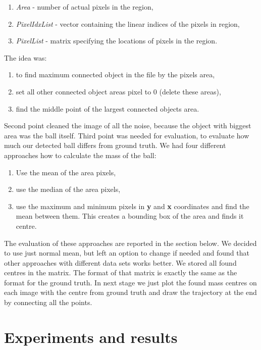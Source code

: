 \documentclass[10pt,a4paper,oneclumn]{article}
\begin{document}
\begin{enumerate}
\item \emph{Area} - number of actual pixels in the region,
\item \emph{PixelIdxList} - vector containing the linear indices of the pixels in region,
\item \emph{PixelList} - matrix specifying the locations of pixels in the region.
\end{enumerate}

The idea was: 
\begin{enumerate}
\item to find maximum connected object in the file by the pixels area, 
\item set all other connected object areas pixel to 0 (delete these areas), 
\item find the middle point of the largest connected objects area. 
\end{enumerate}

Second point cleaned the image of all the noise, because the object with biggest area was the ball itself. Third point was needed for evaluation, to evaluate how much our detected ball differs from ground truth. We had four different approaches how to calculate the mass of the ball:

\begin{enumerate}
\item Use the mean of the area pixels,
\item use the median of the area pixels,
\item use the maximum and minimum pixels in \textbf{y} and \textbf{x} coordinates and find the mean between them. This creates a bounding box of the area and finds it centre.
\end{enumerate}

The evaluation of these approaches are reported in the section below. We decided to use just normal mean, but left an option to change if needed and found that other approaches with different data sets works better. We stored all found centres in the matrix. The format of that matrix is exactly the same as the format for the ground truth. In next stage we just plot the found mass centres on each image with the centre from ground truth and draw the trajectory at the end by connecting all the points.

\section{Experiments and results}
\end{document}
